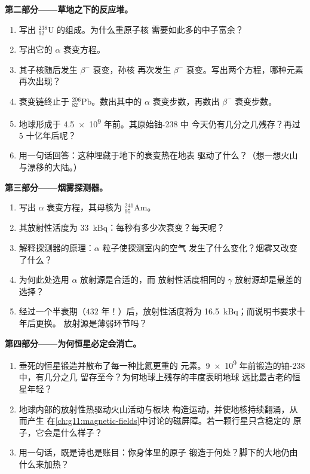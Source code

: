 \begin{problem}
\medskip
\noindent\textbf{第二部分——草地之下的反应堆。}
\begin{enumerate}[resume]
  \item 写出 ${}^{238}_{92}\mathrm{U}$ 的组成。为什么重原子核
        需要如此多的中子富余？
  \item 写出它的 $\alpha$ 衰变方程。
  \item 其子核随后发生 $\beta^-$ 衰变，孙核
        再次发生 $\beta^-$ 衰变。写出两个方程，哪种元素再次出现？
  \item 衰变链终止于 ${}^{206}_{82}\mathrm{Pb}$。数出其中的 $\alpha$
        衰变步数，再数出 $\beta^-$ 衰变步数。
  \item 地球形成于 \num{4.5e9} 年前。其原始铀-238 中
        今天仍有几分之几残存？再过 $5$ 十亿年后呢？
  \item 用一句话回答：这种埋藏于地下的衰变热在地表
        驱动了什么？（想一想火山与漂移的大陆。）
\end{enumerate}

\medskip
\noindent\textbf{第三部分——烟雾探测器。}
\begin{enumerate}[resume]
  \item 写出 $\alpha$ 衰变方程，其母核为 ${}^{241}_{95}\mathrm{Am}$。
  \item 其放射性活度为 \qty{33}{kBq}：每秒有多少次衰变？每天呢？
  \item 解释探测器的原理：$\alpha$ 粒子使探测室内的空气
        发生了什么变化？烟雾又改变了什么？
  \item 为何此处选用 $\alpha$ 放射源是合适的，而
        放射性活度相同的 $\gamma$ 放射源却是最差的选择？
  \item 经过一个半衰期（$432$ 年！）后，放射性活度将为
        \qty{16.5}{kBq}；而说明书要求十年后更换。
        放射源是薄弱环节吗？
\end{enumerate}

\medskip
\noindent\textbf{第四部分——为何恒星必定会消亡。}
\begin{enumerate}[resume]
  \item 垂死的恒星锻造并散布了每一种比氦更重的
        元素。\num{9e9} 年前锻造的铀-238 中，有几分之几
        留存至今？为何地球上残存的丰度表明地球
        远比最古老的恒星年轻？
  \item 地球内部的放射性热驱动火山活动与板块
        构造运动，并使地核持续翻涌，从而产生
        在\cref{ch:g11:magnetic-fields}中讨论的磁屏障。若一颗行星只含稳定的
        原子，它会是什么样子？
  \item 用一句话，既是诗也是账目：你身体里的原子
        锻造于何处？脚下的大地仍由什么来加热？
\end{enumerate}
\end{problem}
